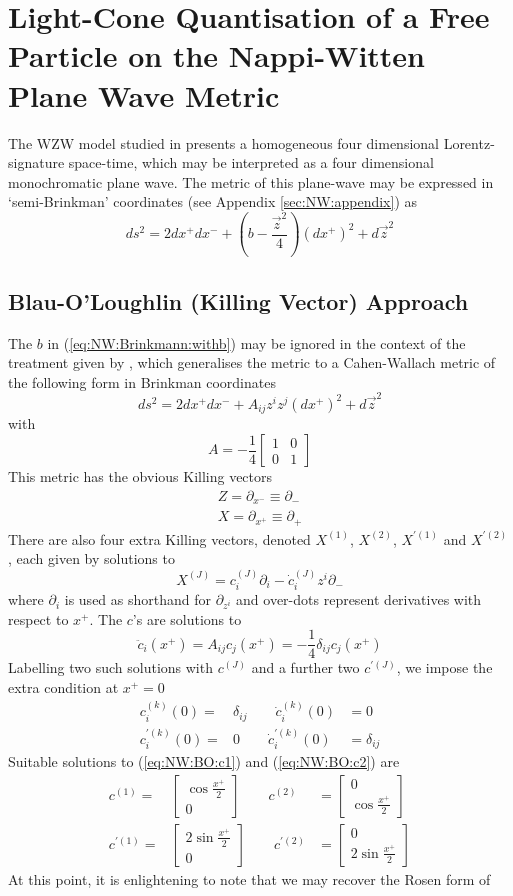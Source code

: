 \documentclass[11pt, a4paper, titlepage]{article}
\newcommand{\be}{\begin{equation}}
\newcommand{\ee}{\end{equation}}
\newcommand{\bea}{\begin{eqnarray}}
\newcommand{\eea}{\end{eqnarray}}
\newcommand{\pd}{\partial}
\newcommand{\lb}{\left(}
\newcommand{\rb}{\right)}
\newcommand{\eqn}[1]{(\ref{#1})}
\newcommand{\mat}[4]{
        \left[\begin{array}{cc}
        #1 & #2 \\
        #3 & #4\end{array}\right]}
\newcommand{\vect}[2]{
        \left[\begin{array}{c} #1 \\ #2 \end{array}\right]}
\begin{document}
\section{Light-Cone Quantisation of a Free Particle on the Nappi-Witten Plane
Wave Metric}
\label{sec:NW}
The WZW model studied in \cite{nw} presents a homogeneous four dimensional
Lorentz-signature space-time, which may be interpreted as a four dimensional
monochromatic plane wave. The metric of this plane-wave may be expressed in
`semi-Brinkman' coordinates (see Appendix \ref{sec:NW:appendix}) as
\be
 \label{eq:NW:Brinkmann:withb}
 ds^2 = 2dx^+dx^- + \lb b - \frac{\vec{z}^2}{4}\rb(dx^+)^2 + d\vec{z}^2
\ee
\subsection{Blau-O'Loughlin (Killing Vector) Approach}
\label{sec:NW:BO}
The $b$ in \eqn{eq:NW:Brinkmann:withb} may be ignored in the context of the
treatment given by \cite{bo}, which generalises the metric to a Cahen-Wallach
metric of the following form in Brinkman coordinates
\be
 \label{eq:NW:BO:Brinkmann}
 ds^2 = 2dx^+dx^- + A_{ij}z^iz^j(dx^+)^2 + d\vec{z}^2
\ee
with
\be
 \label{eq:NW:BO:Brinkmann:A}
 A = -\frac{1}{4} \mat{1}{0}{0}{1}
\ee
This metric has the obvious Killing vectors
\bea
 \label{eq:NW:BO:Z}
 Z=\pd_{x^-} \equiv \pd_{-}\\
 \label{eq:NW:BO:X}
 X=\pd_{x^+}\equiv \pd_{+}
\eea
There are also four extra Killing vectors, denoted $X^{(1)}$, $X^{(2)}$,
$X^{\prime(1)}$ and $X^{\prime(2)}$, each given by solutions to
\be
 \label{eq:NW:BO:XJ}
 X^{(J)} = c_i^{(J)}\pd_i - \dot{c}_i^{(J)}z^i\pd_-
\ee
where $\pd_i$ is used as shorthand for $\pd_{z^i}$ and over-dots represent
derivatives with respect to $x^+$. The $c$'s are solutions to
\be
 \label{eq:NW:BO:c1}
 \ddot{c}_i(x^+)=A_{ij}c_j(x^+)=-\frac{1}{4}\delta_{ij}c_j(x^+)
\ee
Labelling two such solutions with $c^{(J)}$ and a further two $c^{\prime(J)}$, we
impose the extra condition at $x^+=0$
\bea
 \label{eq:NW:BO:c2}
 c_i^{(k)}(0)=&\delta_{ij} \qquad \dot{c}_i^{(k)}(0)&=0 \nonumber \\
 c_i^{\prime(k)}(0)=&0          \qquad \dot{c}_i^{\prime(k)}(0)& =\delta_{ij}
\eea
Suitable solutions to \eqn{eq:NW:BO:c1} and \eqn{eq:NW:BO:c2} are
\bea
 \label{eq:NW:BO:c3}
 c^{(1)}=&\vect{\cos{\frac{x^+}{2}}}{0}
 \qquad c^{(2)}&=\vect{0}{\cos{\frac{x^+}{2}}} \nonumber \\
 c^{\prime(1)}=&\vect{2\sin{\frac{x^+}{2}}}{0}
 \qquad c^{\prime(2)}&=\vect{0}{2\sin{\frac{x^+}{2}}}
\eea
At this point, it is enlightening to note that we may recover the Rosen form of
\end{document}
